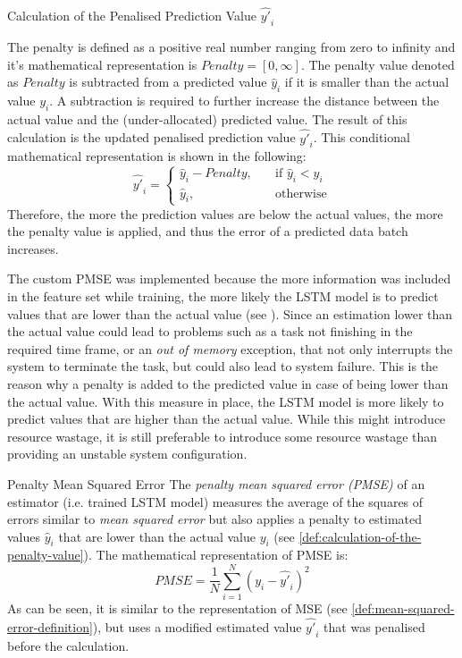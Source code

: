     \begin{pabox}{Calculation of the Penalised Prediction Value $\hat{y'}_i$}
    \label{def:calculation-of-the-penalty-value}

      The penalty is defined as a positive real number ranging from zero to infinity and it's mathematical representation is $Penalty = [0, \infty]$.
      The penalty value denoted as $Penalty$ is subtracted from a predicted value $\hat{y}_i$ if it is smaller than the actual value $y_i$. A subtraction is required to further increase the distance between the actual value and the (under-allocated) predicted value.
      The result of this calculation is the updated penalised prediction value $\hat{y'}_i$.
      This conditional mathematical representation is shown in the following:
      $$\hat{y'}_i = 
      \begin{cases}
        \hat{y}_i - Penalty, & \quad \textrm{if } \hat{y}_i < y_i \\
        \hat{y}_i,  & \quad \textrm{otherwise}
      \end{cases}$$
      Therefore, the more the prediction values are below the actual values, the more the penalty value is applied, and thus the error of a predicted data batch increases.

    \end{pabox}

    The custom PMSE was implemented because the more information was included in the feature set while training, the more likely the LSTM model is to predict values that are lower than the actual value (see ). Since an estimation lower than the actual value could lead to problems such as a task not finishing in the required time frame, or an \emph{out of memory} exception, that not only interrupts the system to terminate the task, but could also lead to system failure. This is the reason why a penalty is added to the predicted value in case of being lower than the actual value. With this measure in place, the LSTM model is more likely to predict values that are higher than the actual value. While this might introduce resource wastage, it is still preferable to introduce some resource wastage than providing an unstable system configuration.

    \begin{pabox}{Penalty Mean Squared Error}
      \label{def:penalty-mean-squared-error-definition}
      The \emph{penalty mean squared error (PMSE)} of an estimator (i.e. trained LSTM model) measures the average of the squares of errors similar to \emph{mean squared error} but also applies a penalty to estimated values $\hat{y}_i$ that are lower than the actual value $y_i$ (see \ref{def:calculation-of-the-penalty-value}). 
      The mathematical representation of PMSE is:
      $$PMSE = \frac{1}{N} \sum_{i = 1}^{N}\left(y_i - \hat{y'}_i\right)^2$$
      As can be seen, it is similar to the representation of MSE (see \ref{def:mean-squared-error-definition}), but uses a modified estimated value $\hat{y'}_i$ that was penalised before the calculation.
    \end{pabox}

